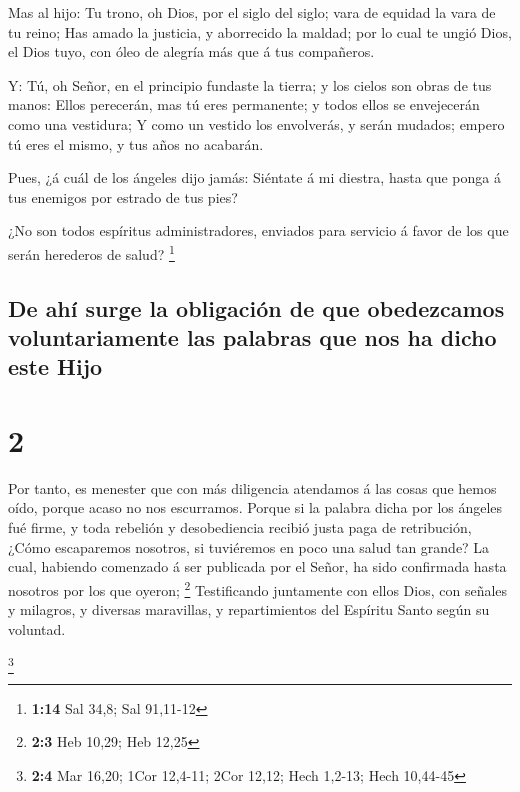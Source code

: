  Mas al hijo: Tu trono, oh Dios, por el siglo del siglo;
vara de equidad la vara de tu reino;  Has amado la justicia,
y aborrecido la maldad; por lo cual te ungió Dios, el Dios tuyo, con
óleo de alegría más que á tus compañeros.

 Y: Tú, oh Señor, en el principio fundaste la tierra; y los
cielos son obras de tus manos:  Ellos perecerán, mas tú
eres permanente; y todos ellos se envejecerán como una vestidura;
 Y como un vestido los envolverás, y serán mudados; empero
tú eres el mismo, y tus años no acabarán.

 Pues, ¿á cuál de los ángeles dijo jamás: Siéntate á mi
diestra, hasta que ponga á tus enemigos por estrado de tus pies?

 ¿No son todos espíritus administradores, enviados para
servicio á favor de los que serán herederos de salud? \footnote{\textbf{1:14}
  Sal 34,8; Sal 91,11-12}

\hypertarget{de-ahuxed-surge-la-obligaciuxf3n-de-que-obedezcamos-voluntariamente-las-palabras-que-nos-ha-dicho-este-hijo}{%
\subsection{De ahí surge la obligación de que obedezcamos
voluntariamente las palabras que nos ha dicho este
Hijo}\label{de-ahuxed-surge-la-obligaciuxf3n-de-que-obedezcamos-voluntariamente-las-palabras-que-nos-ha-dicho-este-hijo}}

\hypertarget{section-1}{%
\section{2}\label{section-1}}

 Por tanto, es menester que con más diligencia atendamos á
las cosas que hemos oído, porque acaso no nos escurramos. 
Porque si la palabra dicha por los ángeles fué firme, y toda rebelión y
desobediencia recibió justa paga de retribución,  ¿Cómo
escaparemos nosotros, si tuviéremos en poco una salud tan grande? La
cual, habiendo comenzado á ser publicada por el Señor, ha sido
confirmada hasta nosotros por los que oyeron; \footnote{\textbf{2:3} Heb
  10,29; Heb 12,25}  Testificando juntamente con ellos Dios,
con señales y milagros, y diversas maravillas, y repartimientos del
Espíritu Santo según su voluntad.

\footnote{\textbf{2:4} Mar 16,20; 1Cor 12,4-11; 2Cor 12,12; Hech 1,2-13;
  Hech 10,44-45}

